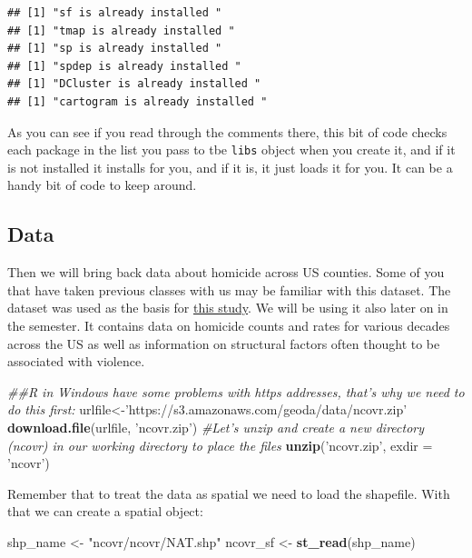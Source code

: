 \documentclass[]{book}
\newenvironment{Shaded}{\begin{snugshade}}{\end{snugshade}}
\newcommand{\CommentTok}[1]{\textcolor[rgb]{0.56,0.35,0.01}{\textit{#1}}}
\newcommand{\DataTypeTok}[1]{\textcolor[rgb]{0.13,0.29,0.53}{#1}}
\newcommand{\KeywordTok}[1]{\textcolor[rgb]{0.13,0.29,0.53}{\textbf{#1}}}
\newcommand{\NormalTok}[1]{#1}
\newcommand{\StringTok}[1]{\textcolor[rgb]{0.31,0.60,0.02}{#1}}
\begin{document}
\begin{verbatim}
## [1] "sf is already installed "
## [1] "tmap is already installed "
## [1] "sp is already installed "
## [1] "spdep is already installed "
## [1] "DCluster is already installed "
## [1] "cartogram is already installed "
\end{verbatim}

As you can see if you read through the comments there, this bit of code checks each package in the list you pass to tbe \texttt{libs} object when you create it, and if it is not installed it installs for you, and if it is, it just loads it for you. It can be a handy bit of code to keep around.

\hypertarget{data}{%
\subsection{Data}\label{data}}

Then we will bring back data about homicide across US counties. Some of you that have taken previous classes with us may be familiar with this dataset. The dataset was used as the basis for \href{https://onlinelibrary.wiley.com/doi/abs/10.1111/j.1745-9125.2001.tb00933.x}{this study}. We will be using it also later on in the semester. It contains data on homicide counts and rates for various decades across the US as well as information on structural factors often thought to be associated with violence.

\begin{Shaded}
\begin{Highlighting}[]
\CommentTok{##R in Windows have some problems with https addresses, that's why we need to do this first:}
\NormalTok{urlfile<-}\StringTok{'https://s3.amazonaws.com/geoda/data/ncovr.zip'}
\KeywordTok{download.file}\NormalTok{(urlfile, }\StringTok{'ncovr.zip'}\NormalTok{)}
\CommentTok{#Let's unzip and create a new directory (ncovr) in our working directory to place the files}
\KeywordTok{unzip}\NormalTok{(}\StringTok{'ncovr.zip'}\NormalTok{, }\DataTypeTok{exdir =} \StringTok{'ncovr'}\NormalTok{)}
\end{Highlighting}
\end{Shaded}

Remember that to treat the data as spatial we need to load the shapefile. With that we can create a spatial object:

\begin{Shaded}
\begin{Highlighting}[]
\NormalTok{shp_name <-}\StringTok{ "ncovr/ncovr/NAT.shp"}
\NormalTok{ncovr_sf <-}\StringTok{ }\KeywordTok{st_read}\NormalTok{(shp_name)}
\end{Highlighting}
\end{Shaded}
\end{document}
